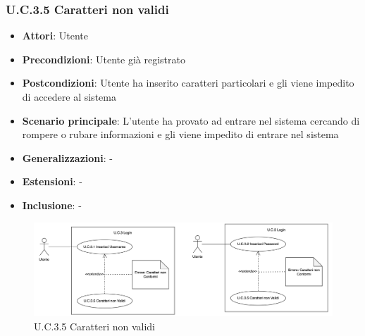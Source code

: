 \subsubsection{U.C.3.5 Caratteri non validi}
\begin{itemize}
    \item \textbf{Attori}: Utente
    \item \textbf{Precondizioni}: Utente già registrato
    \item \textbf{Postcondizioni}: Utente ha inserito caratteri particolari e gli viene impedito di accedere al sistema
    \item \textbf{Scenario principale}: L’utente ha provato ad entrare nel sistema cercando di rompere o rubare informazioni e gli viene impedito di entrare nel sistema
    \item \textbf{Generalizzazioni}: -
    \item \textbf{Estensioni}: -
    \item \textbf{Inclusione}: -
\end{itemize}
\begin{figure}[h!]
    \centering
    \includegraphics[width=\textwidth]{img/UC3-5.png}
    \caption{U.C.3.5 Caratteri non validi}
\end{figure}
